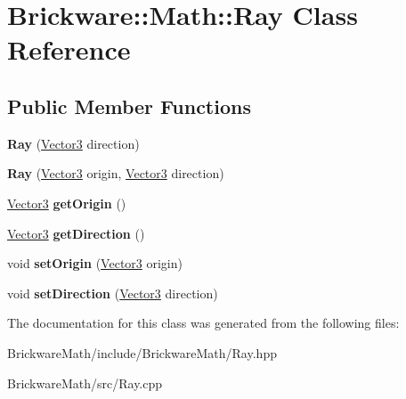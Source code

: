 \hypertarget{classBrickware_1_1Math_1_1Ray}{}\section{Brickware\+:\+:Math\+:\+:Ray Class Reference}
\label{classBrickware_1_1Math_1_1Ray}
\subsection*{Public Member Functions}
\begin{DoxyCompactItemize}
\item 
\hypertarget{classBrickware_1_1Math_1_1Ray_a7c568d4edaf12014926b5a7a349321de}{}{\bfseries Ray} (\hyperlink{classBrickware_1_1Math_1_1Vector3}{Vector3} direction)\label{classBrickware_1_1Math_1_1Ray_a7c568d4edaf12014926b5a7a349321de}

\item 
\hypertarget{classBrickware_1_1Math_1_1Ray_a71ae06efaf3fb994e14f8d329dac8857}{}{\bfseries Ray} (\hyperlink{classBrickware_1_1Math_1_1Vector3}{Vector3} origin, \hyperlink{classBrickware_1_1Math_1_1Vector3}{Vector3} direction)\label{classBrickware_1_1Math_1_1Ray_a71ae06efaf3fb994e14f8d329dac8857}

\item 
\hypertarget{classBrickware_1_1Math_1_1Ray_a6d1aeda795539d434535e83e49ca05c4}{}\hyperlink{classBrickware_1_1Math_1_1Vector3}{Vector3} {\bfseries get\+Origin} ()\label{classBrickware_1_1Math_1_1Ray_a6d1aeda795539d434535e83e49ca05c4}

\item 
\hypertarget{classBrickware_1_1Math_1_1Ray_a2dafaa84ee2a3c6c105b67db0b1660e2}{}\hyperlink{classBrickware_1_1Math_1_1Vector3}{Vector3} {\bfseries get\+Direction} ()\label{classBrickware_1_1Math_1_1Ray_a2dafaa84ee2a3c6c105b67db0b1660e2}

\item 
\hypertarget{classBrickware_1_1Math_1_1Ray_a6119fcd07ff6a53c5fbe8e9275f5759c}{}void {\bfseries set\+Origin} (\hyperlink{classBrickware_1_1Math_1_1Vector3}{Vector3} origin)\label{classBrickware_1_1Math_1_1Ray_a6119fcd07ff6a53c5fbe8e9275f5759c}

\item 
\hypertarget{classBrickware_1_1Math_1_1Ray_a415890b43a4ee68f53e9d946a40ad730}{}void {\bfseries set\+Direction} (\hyperlink{classBrickware_1_1Math_1_1Vector3}{Vector3} direction)\label{classBrickware_1_1Math_1_1Ray_a415890b43a4ee68f53e9d946a40ad730}

\end{DoxyCompactItemize}


The documentation for this class was generated from the following files\+:\begin{DoxyCompactItemize}
\item 
Brickware\+Math/include/\+Brickware\+Math/Ray.\+hpp\item 
Brickware\+Math/src/Ray.\+cpp\end{DoxyCompactItemize}
